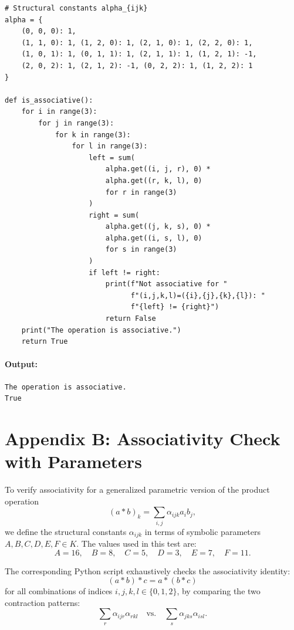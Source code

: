 \documentclass[12pt]{article}
\theoremstyle{definition}
\theoremstyle{plain}
\theoremstyle{remark}
\begin{document}
\begin{verbatim}
# Structural constants alpha_{ijk}
alpha = {
    (0, 0, 0): 1,
    (1, 1, 0): 1, (1, 2, 0): 1, (2, 1, 0): 1, (2, 2, 0): 1,
    (1, 0, 1): 1, (0, 1, 1): 1, (2, 1, 1): 1, (1, 2, 1): -1,
    (2, 0, 2): 1, (2, 1, 2): -1, (0, 2, 2): 1, (1, 2, 2): 1
}

def is_associative():
    for i in range(3):
        for j in range(3):
            for k in range(3):
                for l in range(3):
                    left = sum(
                        alpha.get((i, j, r), 0) *
                        alpha.get((r, k, l), 0)
                        for r in range(3)
                    )
                    right = sum(
                        alpha.get((j, k, s), 0) *
                        alpha.get((i, s, l), 0)
                        for s in range(3)
                    )
                    if left != right:
                        print(f"Not associative for "
                              f"(i,j,k,l)=({i},{j},{k},{l}): "
                              f"{left} != {right}")
                        return False
    print("The operation is associative.")
    return True
\end{verbatim}

\paragraph{Output:}
\begin{verbatim}
The operation is associative.
True
\end{verbatim}

\section*{Appendix B: Associativity Check with Parameters}

To verify associativity for a generalized parametric version of the product operation
\[
(a * b)_k = \sum_{i,j} \alpha_{ijk} a_i b_j,
\]
we define the structural constants \( \alpha_{ijk} \) in terms of symbolic parameters \( A, B, C, D, E, F \in K \). The values used in this test are:
\[
A = 16, \quad B = 8, \quad C = 5, \quad D = 3, \quad E = 7, \quad F = 11.
\]

The corresponding Python script exhaustively checks the associativity identity:
\[
(a * b) * c = a * (b * c)
\]
for all combinations of indices \( i, j, k, l \in \{0,1,2\} \), by comparing the two contraction patterns:
\[
\sum_r \alpha_{ijr} \alpha_{rkl} \quad \text{vs.} \quad \sum_s \alpha_{jks} \alpha_{isl}.
\]
\end{document}
